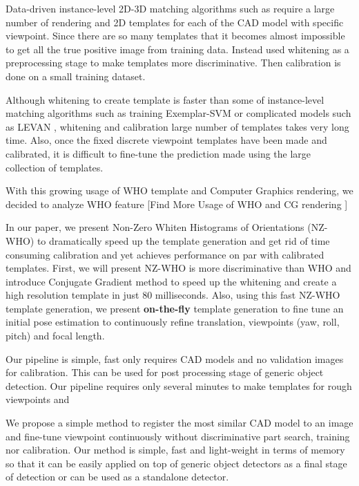 Data-driven instance-level 2D-3D matching algorithms such as \cite{Aubry14, Lim14} require a large number of rendering and 2D templates for each of the CAD model with specific viewpoint. Since there are so many templates that it becomes almost impossible to get all the true positive image from training data. Instead \cite{Aubry14, Lim14} used whitening as a preprocessing stage \cite{Hariharan12} to make templates more discriminative. Then calibration is done on a small training dataset.

Although whitening to create template is faster than some of instance-level matching algorithms such as training Exemplar-SVM \cite{Malisiewicz11} or complicated models such as LEVAN \cite{Divvala14}, whitening and calibration large number of templates takes very long time. Also, once the fixed discrete viewpoint templates have been made and calibrated, it is difficult to fine-tune the prediction made using the large collection of templates.

With this growing usage of WHO template and Computer Graphics rendering, we decided to analyze WHO feature
[Find More Usage of WHO and CG rendering \cite{Pepik12}]

In our paper, we present Non-Zero Whiten Histograms of Orientations (NZ-WHO) to dramatically speed up the template generation and get rid of time consuming calibration and yet achieves performance on par with calibrated templates. First, we will present NZ-WHO is more discriminative than WHO and introduce Conjugate Gradient method to speed up the whitening and create a high resolution template in just 80 milliseconds. Also, using this fast NZ-WHO template generation, we present \textbf{on-the-fly} template generation to fine tune an initial pose estimation to continuously refine translation, viewpoints (yaw, roll, pitch) and focal length.

Our pipeline is simple, fast only requires CAD models and no validation images for calibration. This can be used for post processing stage of generic object detection. Our pipeline requires only several minutes to make templates for rough viewpoints and 

We propose a simple method to register the most similar CAD model to an image and fine-tune viewpoint continuously without discriminative part search, training nor calibration. Our method is simple, fast and light-weight in terms of memory so that it can be easily applied on top of generic object detectors as a final stage of detection or can be used as a standalone detector. 


